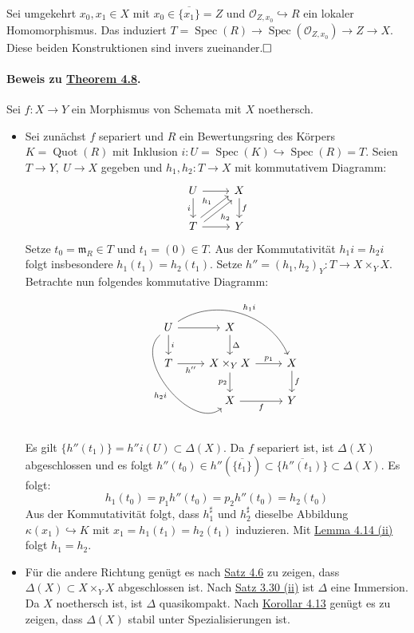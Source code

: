 \documentclass[11pt,b5paper,openany]{memoir}
\def \qed {$\hfill\square$}
\begin{document}
Sei umgekehrt $x_0,x_1\in X$ mit $x_0\in\overline{\{x_1\}}= Z$ und $\mathcal{O}_{Z,x_0}\hookrightarrow R$ ein lokaler Homomorphismus. Das induziert $T=\operatorname{Spec}(R)\to\operatorname{Spec}(\mathcal{O}_{Z,x_0})\to Z\to X$. Diese beiden Konstruktionen sind invers zueinander.\qed

\paragraph{Beweis zu \hyperref[4.8]{Theorem 4.8}.} Sei $f:X\to Y$ ein Morphismus von Schemata mit $X$ noethersch.
\begin{itemize}
\item Sei zunächst $f$ separiert und $R$ ein Bewertungsring des Körpers $K=\operatorname{Quot}(R)$ mit Inklusion $i:U=\operatorname{Spec}(K)\hookrightarrow\operatorname{Spec}(R)=T$. Seien $T\to Y,\ U\to X$ gegeben und $h_1,h_2:T\to X$ mit kommutativem Diagramm:
\[\begin{tikzcd}
U\ar[d, "i"']\ar[r] & X\ar[d, "f"]\\
T\ar[r]\ar[ur, "h_1", shift left]\ar[ur, "h_2"', shift right] & Y
\end{tikzcd} \]
Setze $t_0=\mathfrak{m}_R\in T$ und $t_1=(0)\in T$. Aus der Kommutativität $h_1i=h_2i$ folgt insbesondere $h_1(t_1)=h_2(t_1)$. Setze $h''=(h_1,h_2)_Y:T\to X\times_Y X$. Betrachte nun folgendes kommutative Diagramm:
\[\begin{tikzcd}
U\ar[r]\ar[d, "i"]\ar[rdd, "h_2i"', bend right=90]\ar[rrd, "h_1i", bend left=50] & X\ar[d, "\Delta"] &\\
T\ar[r, "h''"'] & X\times_Y X\ar[r, "p_1"]\ar[d, "p_2"'] & X\ar[d, "f"]\\
& X\ar[r, "f"'] & Y
\end{tikzcd}\]
Es gilt $\{h''(t_1)\}= h''i(U)\subset\Delta(X)$. Da $f$ separiert ist, ist $\Delta(X)$ abgeschlossen und es folgt $h''(t_0)\in h''(\overline{\{t_1\}})\subset\overline{\{h''(t_1)\}}\subset\Delta(X)$. Es folgt:
\[h_1(t_0)=p_1h''(t_0)=p_2h''(t_0)=h_2(t_0) \]
Aus der Kommutativität folgt, dass $h_1^\sharp$ und $h_2^\sharp$ dieselbe Abbildung $\kappa(x_1)\hookrightarrow K$ mit $x_1=h_1(t_1)=h_2(t_1)$ induzieren. Mit \hyperref[4.14]{Lemma 4.14 (ii)} folgt $h_1=h_2$.
\item Für die andere Richtung genügt es nach \hyperref[4.6]{Satz 4.6} zu zeigen, dass $\Delta(X)\subset X\times_YX$ abgeschlossen ist. Nach \hyperref[3.30]{Satz 3.30 (ii)} ist $\Delta$ eine Immersion. Da $X$ noethersch ist, ist $\Delta$ quasikompakt. Nach \hyperref[4.13]{Korollar 4.13} genügt es zu zeigen, dass $\Delta(X)$ stabil unter Spezialisierungen ist.


\end{itemize}
\end{document}

